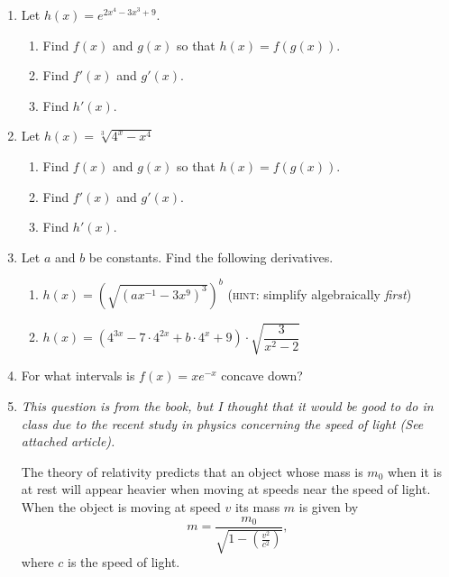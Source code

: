 \documentclass[11pt]{article}
\newcommand{\ds}{\displaystyle}
\begin{document}
\drawtitle
\begin{enumerate}
\item Let $h(x)=e^{2x^4-3x^3+9}$.
  \begin{enumerate}
  \item Find $f(x)$ and $g(x)$ so that $h(x)=f(g(x))$.
    \vfill
  \item Find $f'(x)$ and $g'(x)$.
    \vfill
  \item Find $h'(x)$.
    \vfill
  \end{enumerate}

\item Let $h(x)=\sqrt[3]{4^x-x^4}$
  \begin{enumerate}
  \item Find $f(x)$ and $g(x)$ so that $h(x)=f(g(x))$.
    \vfill
  \item Find $f'(x)$ and $g'(x)$.
    \vfill
  \item Find $h'(x)$.
    \vfill
  \end{enumerate}
  
\newpage

\item Let $a$ and $b$ be constants. Find the following derivatives.
  \begin{enumerate}
  \item $\ds h(x)=\left(\sqrt{\left(ax^{-1}-3x^9\right)^3}\right)^{b}$
    (\textsc{hint}: simplify algebraically \textit{first})
    \vfill
  \item $\ds h(x)=\left(4^{3x}-7\cdot 4^{2x}+b\cdot
      4^x+9\right)\cdot\sqrt{\dfrac{3}{x^2-2}}$
    \vfill
  \end{enumerate}

\newpage

\item For what intervals is $f(x) = xe^{-x}$ concave down?

\newpage

\item \textit{This question is from the book, but I thought that it
    would be good to do in class due to the recent study in physics
    concerning the speed of light (See attached article).}

The theory of relativity predicts that an object whose mass is $m_0$
when it is at rest will appear heavier when moving at speeds near the
speed of light.  When the object is moving at speed $v$ its mass $m$
is given by
\begin{equation}\tag{1}\label{light}
m = \frac{m_0}{\sqrt{1-\left(\frac{v^2}{c^2}\right)}},
\end{equation}
where $c$ is the speed of light.


\end{enumerate}
\end{document}
